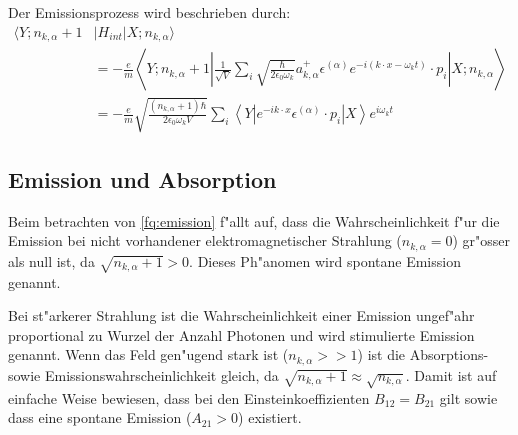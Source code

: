 Der Emissionsprozess wird beschrieben durch:
\begin{equation} \label{fq:emission}
\begin{split}
\langle Y; n_{k,\alpha} + 1 &| H_{int} | X; n_{k,\alpha} \rangle \\
&= -\frac{e}{m} \left\langle Y; n_{k,\alpha} + 1 \left| 
\frac{1}{\sqrt{V}} \sum_i \sqrt{\frac{\hbar}{2 \epsilon_0 \omega_k}}a^+_{k,\alpha} \epsilon^{(\alpha)} e^{-i(k \cdot x-\omega_k t)} \cdot p_i 
\right| X; n_{k,\alpha} \right\rangle\\
&= -\frac{e}{m} \sqrt{\frac{ (n_{k,\alpha}+1) \hbar}{2 \epsilon_0 \omega_k V}} \sum_i \left\langle Y \left| 
e^{-ik \cdot x} \epsilon^{(\alpha)} \cdot p_i 
\right| X \right\rangle e^{i\omega_k t}
\end{split}
\end{equation}

\subsection{Emission und Absorption}
Beim betrachten von \ref{fq:emission} f"allt auf, dass die Wahrscheinlichkeit f"ur die Emission bei nicht vorhandener elektromagnetischer Strahlung ($n_{k,\alpha} = 0$) gr"osser als null ist, da $\sqrt{n_{k,\alpha}+1} > 0$. Dieses Ph"anomen wird spontane Emission genannt.

Bei st"arkerer Strahlung ist die Wahrscheinlichkeit einer Emission ungef"ahr proportional zu Wurzel der Anzahl Photonen und wird stimulierte Emission genannt.
Wenn das Feld gen"ugend stark ist ($n_{k,\alpha} >> 1$) ist die Absorptions- sowie Emissionswahrscheinlichkeit gleich, da $\sqrt{n_{k,\alpha}+1} \approx \sqrt{n_{k,\alpha}}$. Damit ist auf einfache Weise bewiesen, dass bei den Einsteinkoeffizienten \cite{fq:einstein_koeff} $B_{12} = B_{21}$ gilt sowie dass eine spontane Emission ($A_{21} > 0$) existiert.
